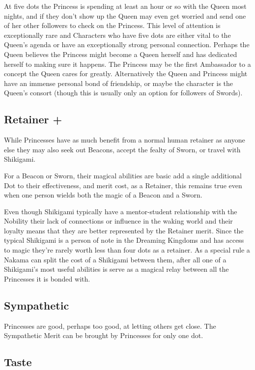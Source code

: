 At five dots the Princess is spending at least an hour or so with the Queen most nights, and if they don't show up the Queen may even get worried and send one of her other followers to check on the Princess. This level of attention is exceptionally rare and Characters who have five dots are either vital to the Queen's agenda or have an exceptionally strong personal connection. Perhaps the Queen believes the Princess might become a Queen herself and has dedicated herself to making sure it happens. The Princess may be the first Ambassador to a concept the Queen cares for greatly. Alternatively the Queen and Princess might have an immense personal bond of friendship, or maybe the character is the Queen's consort (though this is usually only an option for followers of Swords).

\subsection*{Retainer \textbullet+}

While Princesses have as much benefit from a normal human retainer as anyone else they may also seek out Beacons, accept the fealty of Sworn, or travel with Shikigami. 

For a Beacon or Sworn, their magical abilities are basic add a single additional Dot to their effectiveness, and merit cost, as a Retainer, this remains true even when one person wields both the magic of a Beacon and a Sworn. 

Even though Shikigami typically have a mentor-student relationship with the Nobility their lack of connections or influence in the waking world and their loyalty means that they are better represented by the Retainer merit. Since the typical Shikigami is a person of note in the Dreaming Kingdoms and has access to magic they're rarely worth less than four dots as a retainer. As a special rule a Nakama can split the cost of a Shikigami between them, after all one of a Shikigami's most useful abilities is serve as a magical relay between all the Princesses it is bonded with. 

\subsection*{Sympathetic \textbullet}

Princesses are good, perhaps too good, at letting others get close. The Sympathetic Merit can be brought by Princesses for only one dot. 

\subsection*{Taste \textbullet}

